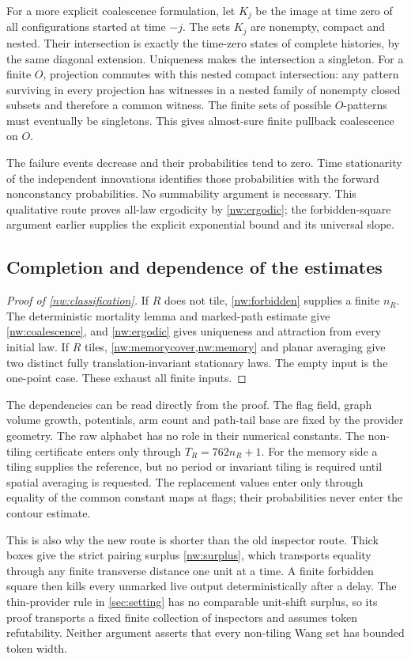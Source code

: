 For a more explicit coalescence formulation, let $K_j$ be the image at time zero of all configurations started at time $-j$. The sets $K_j$ are nonempty, compact and nested. Their intersection is exactly the time-zero states of complete histories, by the same diagonal extension. Uniqueness makes the intersection a singleton. For a finite $O$, projection commutes with this nested compact intersection: any pattern surviving in every projection has witnesses in a nested family of nonempty closed subsets and therefore a common witness. The finite sets of possible $O$-patterns must eventually be singletons. This gives almost-sure finite pullback coalescence on $O$.

The failure events decrease and their probabilities tend to zero. Time stationarity of the independent innovations identifies those probabilities with the forward nonconstancy probabilities. No summability argument is necessary. This qualitative route proves all-law ergodicity by \cref{nw:ergodic}; the forbidden-square argument earlier supplies the explicit exponential bound and its universal slope.

\subsection{Completion and dependence of the estimates}

\begin{proof}[Proof of \cref{nw:classification}]
If $R$ does not tile, \cref{nw:forbidden} supplies a finite $n_R$. The deterministic mortality lemma and marked-path estimate give \eqref{nw:coalescence}, and \cref{nw:ergodic} gives uniqueness and attraction from every initial law. If $R$ tiles, \cref{nw:memorycover,nw:memory} and planar averaging give two distinct fully translation-invariant stationary laws. The empty input is the one-point case. These exhaust all finite inputs.
\end{proof}

The dependencies can be read directly from the proof. The flag field, graph volume growth, potentials, arm count and path-tail base are fixed by the provider geometry. The raw alphabet has no role in their numerical constants. The non-tiling certificate enters only through $T_R=762n_R+1$. For the memory side a tiling supplies the reference, but no period or invariant tiling is required until spatial averaging is requested. The replacement values enter only through equality of the common constant maps at flags; their probabilities never enter the contour estimate.

This is also why the new route is shorter than the old inspector route. Thick boxes give the strict pairing surplus \eqref{nw:surplus}, which transports equality through any finite transverse distance one unit at a time. A finite forbidden square then kills every unmarked live output deterministically after a delay. The thin-provider rule in \cref{sec:setting} has no comparable unit-shift surplus, so its proof transports a fixed finite collection of inspectors and assumes token refutability. Neither argument asserts that every non-tiling Wang set has bounded token width.




